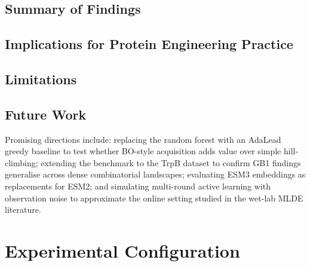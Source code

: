 \documentclass[english, 12pt, a4paper, elec, utf8, a-2b, online]{aaltothesis}
\begin{document}
\subsection{Summary of Findings}


\subsection{Implications for Protein Engineering Practice}


\subsection{Limitations}


\subsection{Future Work}

Promising directions include:
replacing the random forest with an AdaLead greedy baseline to test whether BO-style
acquisition adds value over simple hill-climbing;
extending the benchmark to the TrpB dataset to confirm GB1 findings generalise
across dense combinatorial landscapes;
evaluating ESM3 embeddings as replacements for ESM2;
and simulating multi-round active learning with observation noise to approximate the
online setting studied in the wet-lab MLDE literature.

\clearpage
\printbibliography[heading=bibintoc]

\clearpage
\thesisappendix
\section{Experimental Configuration}
\label{app:config}

\end{document}
